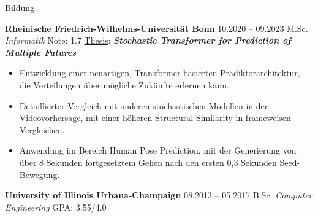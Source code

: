 \begin{rubric}{Bildung}


\entry*[] \textbf{Rheinische Friedrich-Wilhelms-Universität Bonn} \hfill 10.2020 -- 09.2023  \newline
  M.Sc. \emph{Informatik}  \hfill Note:  1.7 \newline %
  \underline{Thesis}:  \hspace*{5mm} \textit{\textbf{Stochastic Transformer for Prediction of Multiple Futures}} \newline 
  \vspace{\CVItemizeHeaderSpacing} \begin{itemize}[leftmargin=*, rightmargin=1cm]
  	\setlength{\itemsep}{\CVItemizeSpacing}  
  	\item Entwicklung einer neuartigen, Transformer-basierten Prädiktorarchitektur, die Verteilungen über mögliche Zukünfte erlernen kann.
  	\item Detaillierter Vergleich mit anderen stochastischen Modellen in der Videovorhersage, mit einer höheren Structural Similarity in frameweisen Vergleichen.  
  	\item Anwendung im Bereich Human Pose Prediction, mit der Generierung von über 8 Sekunden fortgesetztem Gehen nach den ersten 0,3 Sekunden Seed-Bewegung.  
 \end{itemize}

\entry*[] \textbf{University of Illinois Urbana-Champaign} \hfill 08.2013 -- 05.2017  \newline
 B.Sc. \emph{Computer Engineering} \hfill GPA: 3.55/4.0 \newline %



\end{rubric}